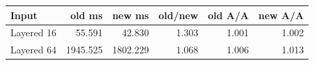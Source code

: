 \begin{center}
\small
\begin{tabular}{lrrrrr}
\toprule
Input & old ms & new ms & old/new & old A/A & new A/A\\
\midrule
Layered 16 & 55.591 & 42.830 & 1.303 & 1.001 & 1.002\\
Layered 64 & 1945.525 & 1802.229 & 1.068 & 1.006 & 1.013\\
\bottomrule
\end{tabular}
\end{center}

